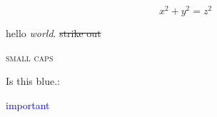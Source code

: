 \usepackage{ulem}
\usepackage{xcolor}
\usepackage{lipsum}
\usepackage{amsmath, amssymb}


$$
x^2 + y^2 = z^2
$$
%


hello \emph{world}.
\sout{strike out}

\textsc{small caps}

\color{blue}   Is this blue.:   

\textcolor{blue}{important}


